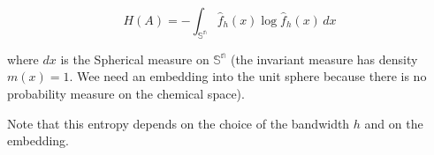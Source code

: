 \[ H(A) = -\int_\mathbb{{S}^n}  \hat{f}_h(x)\log  \hat{f}_h(x) \,dx  \]



where $dx$ is the Spherical measure on $\mathbb{{S}^n}$ (the invariant measure has density $m(x)=1$. Wee need an embedding into the unit sphere because there is no probability measure on the chemical space).

Note that this entropy depends on the choice of the bandwidth $h$ and on the embedding.
